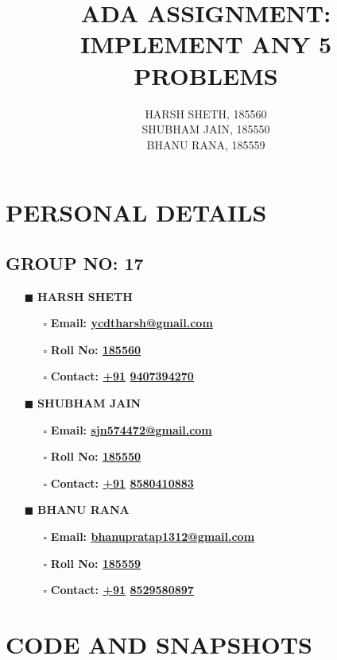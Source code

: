 \documentclass[12pt]{article}
\title{\textbf{ADA ASSIGNMENT: \\ IMPLEMENT ANY 5 PROBLEMS}}
\author{HARSH SHETH, 185560 \\ SHUBHAM JAIN, 185550 \\ BHANU RANA, 185559}
\begin{document}
  \begin{titlepage}
    \maketitle
  \end{titlepage}
  \section{PERSONAL DETAILS}
  \subsection{GROUP NO: 17}
  \begin{itemize}
  \item[$\blacksquare$]{\textbf{HARSH SHETH}}
    \begin{itemize}
      \item[$\square$]{\textbf{Email: \underline{ycdtharsh@gmail.com}}}
      \item[$\square$]{\textbf{Roll No: \underline{185560}}}
      \item[$\square$]{\textbf{Contact: \underline{+91} \underline{9407394270}}}
    \end{itemize}
  \item[$\blacksquare$]{\textbf{SHUBHAM JAIN}}
    \begin{itemize}
      \item[$\square$]{\textbf{Email: \underline{sjn574472@gmail.com}}}
      \item[$\square$]{\textbf{Roll No: \underline{185550}}}
      \item[$\square$]{\textbf{Contact: \underline{+91} \underline{8580410883}}}
    \end{itemize}
  \item[$\blacksquare$]{\textbf{BHANU RANA}}
    \begin{itemize}
      \item[$\square$]{\textbf{Email: \underline{bhanupratap1312@gmail.com}}}
      \item[$\square$]{\textbf{Roll No: \underline{185559} }}
      \item[$\square$]{\textbf{Contact: \underline{+91} \underline{8529580897}}}
    \end{itemize}
  \end{itemize}
  \newpage

  \section{CODE AND SNAPSHOTS}
\end{document}
